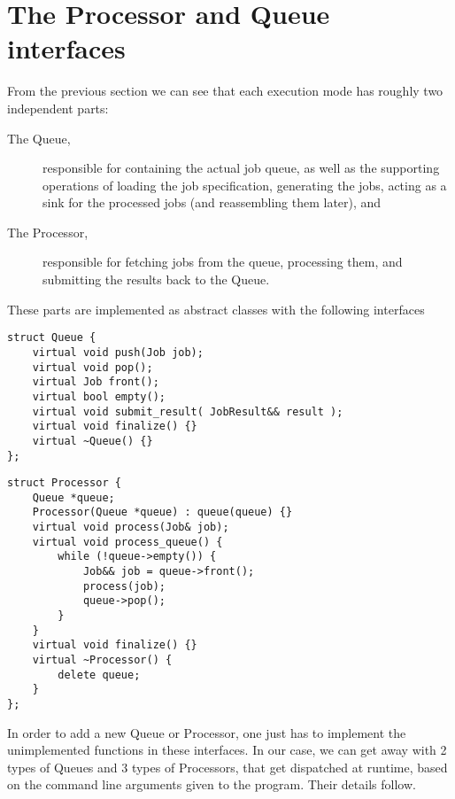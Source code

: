 \documentclass[a4paper]{article}
\begin{document}
	\section{The Processor and Queue interfaces}
	From the previous section we can see that each execution mode has roughly two independent parts: 
	\begin{description}
		\item[The Queue,] responsible for containing the actual job queue, as well as the supporting operations of loading the job specification, generating the jobs, acting as a sink for the processed jobs (and reassembling them later), and
		\item[The Processor,] responsible for fetching jobs from the queue, processing them, and submitting the results back to the Queue.
	\end{description}
	
	These parts are implemented as abstract classes with the following interfaces
	
	\begin{verbatim}
struct Queue {
	virtual void push(Job job);
	virtual void pop();
	virtual Job front();
	virtual bool empty();
	virtual void submit_result( JobResult&& result );
	virtual void finalize() {}
	virtual ~Queue() {}
};
	\end{verbatim}
	
	\begin{verbatim}
struct Processor {
	Queue *queue;
	Processor(Queue *queue) : queue(queue) {}
	virtual void process(Job& job);
	virtual void process_queue() {
		while (!queue->empty()) {
			Job&& job = queue->front();
			process(job);
			queue->pop();
		}
	}
	virtual void finalize() {}
	virtual ~Processor() {
		delete queue;
	}
};
	\end{verbatim}
	
	In order to add a new Queue or Processor, one just has to implement the unimplemented functions in these interfaces. In our case, we can get away with 2 types of Queues and 3 types of Processors, that get dispatched at runtime, based on the command line arguments given to the program. Their details follow.
	
\end{document}
